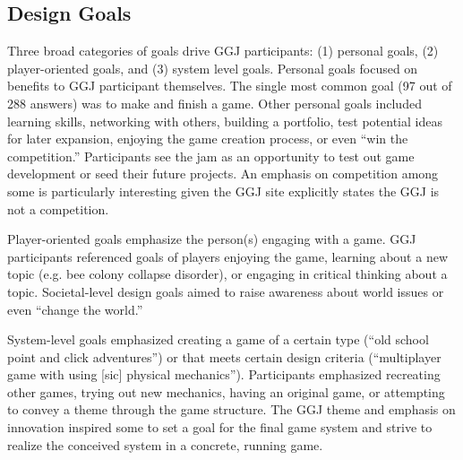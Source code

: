 \documentclass{sig-alternate}
\begin{document}

\subsection{Design Goals}
Three broad categories of goals drive GGJ participants: (1) personal goals, (2) player-oriented goals, and (3) system level goals.
Personal goals focused on benefits to GGJ participant themselves. 
The single most common goal (97 out of 288 answers) was to make and finish a game. 
Other personal goals included learning skills, networking with others, building a portfolio, test potential ideas for later expansion, enjoying the game creation process, or even ``win the competition.'' 
Participants see the jam as an opportunity to test out game development or seed their future projects.
An emphasis on competition among some is particularly interesting given the GGJ site explicitly states the GGJ is not a competition. %

Player-oriented goals emphasize the person(s) engaging with a game.
GGJ participants referenced goals of players enjoying the game, learning about a new topic (e.g. bee colony collapse disorder), or engaging in critical thinking about a topic. Societal-level design goals aimed to raise awareness about world issues or even ``change the world.''

System-level goals emphasized creating a game of a certain type (``old school point and click adventures'') or that meets certain design criteria (``multiplayer game with using [sic] physical mechanics''). Participants emphasized recreating other games, trying out new mechanics, having an original game, or attempting to convey a theme through the game structure. The GGJ theme and emphasis on innovation inspired some to set a goal for the final game system and strive to realize the conceived system in a concrete, running game.
\end{document}

